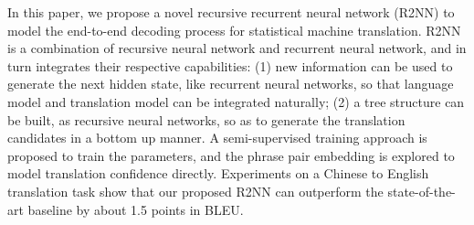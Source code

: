 In this paper, we propose a novel recursive recurrent neural network (R2NN) to model the end-to-end decoding process for statistical machine translation. R2NN is a combination of recursive neural network and recurrent neural network, and in turn integrates their respective capabilities: (1) new information can be used to generate the next hidden state, like recurrent neural networks, so that language model and translation model can be integrated naturally; (2) a tree structure can be built, as recursive neural networks, so as to generate the translation candidates in a bottom up manner. A semi-supervised training approach is proposed to train the parameters, and the phrase pair embedding is explored to model translation confidence directly. Experiments on a Chinese to English translation task show that our proposed R2NN can outperform the state-of-the-art baseline by about 1.5 points in BLEU.
